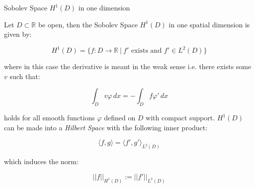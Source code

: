 \begin{definition}\label{def:oned-H1-D}
    Sobolev Space $H^1(D)$ in one dimension

    Let $D \subset \mathbb{R}$ be open, then the Sobolev Space $H^1(D)$ in one
    spatial dimension is given by:

    \begin{equation}\label{eq:oned-H1-D}
        H^1(D) = \{f: D \rightarrow \mathbb{R}\ |\ f' \text{ exists and }
                    f' \in L^2(D)\}
    \end{equation}

    where in this case the derivative is meant in the weak sense i.e. there
    exists some $v$ such that:

    \[
        \int_D v\varphi\, dx = -\int_Df\varphi'\, dx
    \]

    holds for all smooth functions $\varphi$ defined on $D$ with compact
    support. $H^1(D)$ can be made into a \textit{Hilbert Space} with the
    following inner product:

    \begin{equation}\label{eq:oned-H1-D-inner-prod}
        \langle f, g\rangle = \langle f', g' \rangle_{L^2(D)}
    \end{equation}

    which induces the norm:

    \begin{equation}\label{eq:oned-H1-D-norm}
        ||f||_{H^1(D)} := ||f'||_{L^2(D)}
    \end{equation}
\end{definition}

